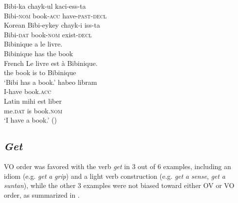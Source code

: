 \ea\label{ex:129}
    \ea \gll Bibi-ka    chayk-ul   kaci-ess-ta  \\ 
    Bibi-\textsc{nom} book-\textsc{acc} have-\textsc{past-decl} \\ \hfill  Korean
    \ex \gll Bibi-eykey chayk-i     iss-ta \\
    Bibi-\textsc{dat}     book-\textsc{nom} exist-\textsc{decl} \\
    \ex \gll Bibinique a  le livre.   \\
     Bibinique has the book  \\  \hfill  French 
    \ex \gll Le  livre  est à Bibinique. \\
     the book is   to Bibinique \\
     \glt `Bibi has a book.'
     \ex \gll habeo libram  \\ 
        I-have book.\textsc{acc}    \\    \hfill Latin
     \ex \gll mihi    est liber          \\
        me.\textsc{dat} is   book.\textsc{nom}  \\
        \glt `I have a book.' (\citealt[130, (46)]{DenDikken1995})
     \z
\z

\subsection{\textit{Get}}\label{ch5:sect:5.7.2}
\largerpage
\ac{VO} order was favored with the verb \textit{get} in 3 out of 6 examples, including an idiom (e.g. \textit{get} \textit{a} \textit{grip}) and a light verb construction (e.g. \textit{get} \textit{a} \textit{sense}, \textit{get} \textit{a} \textit{suntan}), while the other 3 examples were not biased toward either \ac{OV} or \ac{VO} order, as summarized in .

\begin{table}
\caption{Item-based analysis for \textit{get} in Korean-English code-switching
(n$^0$ of occurrence 0–4: \textsc{OV} biased; 5–9: not biased; 10–14: \textsc{VO} biased)
}
\label{tab:5.4}
\end{table}

